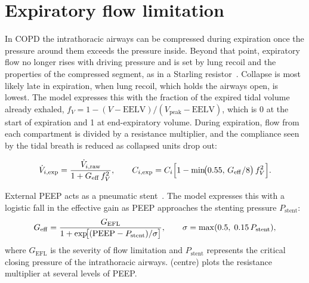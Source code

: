 \section{Expiratory flow limitation}
\label{sec:mech-efl}
In COPD the intrathoracic airways can be compressed during expiration once the pressure around them exceeds the pressure inside. Beyond that point, expiratory flow no longer rises with driving pressure and is set by lung recoil and the properties of the compressed segment, as in a Starling resistor~\citep{permutt1963,mead1967}. Collapse is most likely late in expiration, when lung recoil, which holds the airways open, is lowest. The model expresses this with the fraction of the expired tidal volume already exhaled, $f_V = 1 - (V - \mathrm{EELV})/(V_{\mathrm{peak}} - \mathrm{EELV})$, which is 0 at the start of expiration and 1 at end-expiratory volume. During expiration, flow from each compartment is divided by a resistance multiplier, and the compliance seen by the tidal breath is reduced as collapsed units drop out:
\begin{keyequation}
\begin{equation}
\dot V_{i,\mathrm{exp}} = \frac{\dot V_{i,\mathrm{raw}}}{1 + G_{\mathrm{eff}}\,f_V^2},
\qquad
C_{i,\mathrm{exp}} = C_i\Bigl[1 - \min\!\bigl(0.55,\,G_{\mathrm{eff}}/8\bigr)\,f_V^2\Bigr].
\label{eq:mech-efl}
\end{equation}
\end{keyequation}
External PEEP acts as a pneumatic stent~\citep{tobin1989}. The model expresses this with a logistic fall in the effective gain as PEEP approaches the stenting pressure $P_{\mathrm{stent}}$:
\begin{equation}
G_{\mathrm{eff}} = \frac{G_{\mathrm{EFL}}}{1 + \exp\!\bigl[(\mathrm{PEEP} - P_{\mathrm{stent}})/\sigma\bigr]},\qquad \sigma = \max(0.5,\;0.15\,P_{\mathrm{stent}}),
\label{eq:mech-stent}
\end{equation}
where $G_{\mathrm{EFL}}$ is the severity of flow limitation and $P_{\mathrm{stent}}$ represents the critical closing pressure of the intrathoracic airways.  (centre) plots the resistance multiplier at several levels of PEEP.

